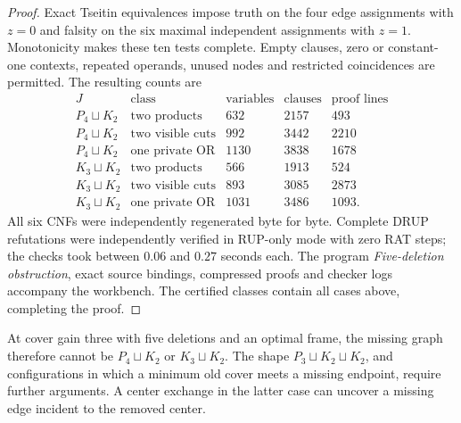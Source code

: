 \begin{proof}
Exact Tseitin equivalences impose truth on the four edge assignments with $z=0$ and falsity on the six maximal independent assignments with $z=1$. Monotonicity makes these ten tests complete. Empty clauses, zero or constant-one contexts, repeated operands, unused nodes and restricted coincidences are permitted. The resulting counts are
\[
\begin{array}{c|l|r|r|r}
J&\text{class}&\text{variables}&\text{clauses}&\text{proof lines}\\\hline
P_4\sqcup K_2&\text{two products}&632&2157&493\\
P_4\sqcup K_2&\text{two visible cuts}&992&3442&2210\\
P_4\sqcup K_2&\text{one private OR}&1130&3838&1678\\
K_3\sqcup K_2&\text{two products}&566&1913&524\\
K_3\sqcup K_2&\text{two visible cuts}&893&3085&2873\\
K_3\sqcup K_2&\text{one private OR}&1031&3486&1093.
\end{array}
\]
All six CNFs were independently regenerated byte for byte. Complete DRUP refutations were independently verified in RUP-only mode with zero RAT steps; the checks took between $0.06$ and $0.27$ seconds each. The program \emph{Five-deletion obstruction}, exact source bindings, compressed proofs and checker logs accompany the workbench. The certified classes contain all cases above, completing the proof.
\end{proof}

At cover gain three with five deletions and an optimal frame, the missing graph therefore cannot be $P_4\sqcup K_2$ or $K_3\sqcup K_2$. The shape $P_3\sqcup K_2\sqcup K_2$, and configurations in which a minimum old cover meets a missing endpoint, require further arguments. A center exchange in the latter case can uncover a missing edge incident to the removed center.
